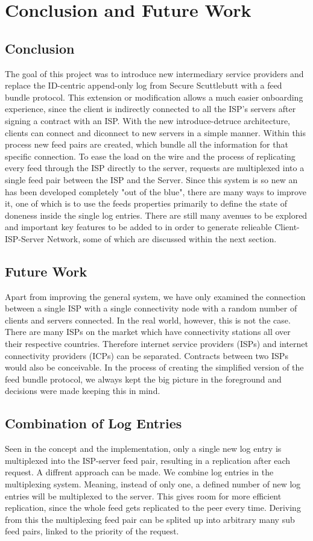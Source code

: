 \chapter{Conclusion and Future Work}
\section{Conclusion}
The goal of this project was to introduce new intermediary service providers and replace the ID-centric append-only log from Secure Scuttlebutt with a feed bundle protocol. This extension or modification allows a much easier onboarding experience, since the client is indirectly connected to all the ISP's servers after signing a contract with an ISP. With the new introduce-detruce architecture, clients can connect and diconnect to new servers in a simple manner. Within this process new feed pairs are created, which bundle all the information for that specific connection. To ease the load on the wire and the process of replicating every feed through the ISP directly to the server, requests are multiplexed into a single feed pair between the ISP and the Server.
Since this system is so new an has been developed completely "out of the blue", there are many ways to improve it, one of which is to use the feeds properties primarily to define the state of doneness inside the single log entries. There are still many avenues to be explored and important key features to be added to in order to generate relieable Client-ISP-Server Network, some of which are discussed within the next section.

\section{Future Work}
Apart from improving the general system, we have only examined the connection between a single ISP with a single connectivity node with a random number of clients and servers connected. In the real world, however,  this is not the case. There are many ISPs on the market which have connectivity stations all over their respective countries. Therefore internet service providers (ISPs) and internet connectivity providers (ICPs) can be separated. Contracts between two ISPs would also be conceivable. In the process of creating the simplified version of the feed bundle protocol, we always kept the big picture in the foreground and decisions were made keeping this in mind.

\section{Combination of Log Entries}
Seen in the concept and the implementation, only a single new log entry is multiplexed into the ISP-server feed pair, resulting in a replication after each request. A diffrent approach can be made. We combine log entries in the multiplexing system. Meaning, instead of only one, a defined number of new log entries will be multiplexed to the server. This gives room for more efficient replication, since the whole feed gets replicated to the peer every time. Deriving from this the multiplexing feed pair can be splited up into arbitrary many sub feed pairs, linked to the priority of the request. 
